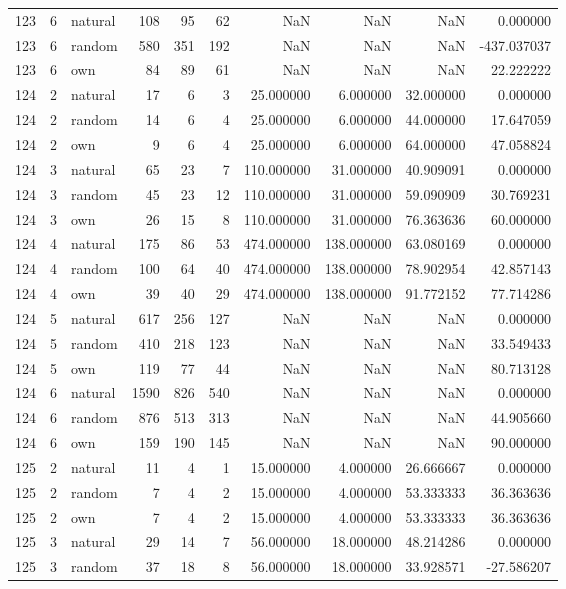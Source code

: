 \begin{table}[htbp]
\begin{tabular}{rrlrrrrrrr}
123 & 6 & natural & 108 & 95 & 62 & NaN & NaN & NaN & 0.000000 \\
123 & 6 & random & 580 & 351 & 192 & NaN & NaN & NaN & -437.037037 \\
123 & 6 & own & 84 & 89 & 61 & NaN & NaN & NaN & 22.222222 \\
124 & 2 & natural & 17 & 6 & 3 & 25.000000 & 6.000000 & 32.000000 & 0.000000 \\
124 & 2 & random & 14 & 6 & 4 & 25.000000 & 6.000000 & 44.000000 & 17.647059 \\
124 & 2 & own & 9 & 6 & 4 & 25.000000 & 6.000000 & 64.000000 & 47.058824 \\
124 & 3 & natural & 65 & 23 & 7 & 110.000000 & 31.000000 & 40.909091 & 0.000000 \\
124 & 3 & random & 45 & 23 & 12 & 110.000000 & 31.000000 & 59.090909 & 30.769231 \\
124 & 3 & own & 26 & 15 & 8 & 110.000000 & 31.000000 & 76.363636 & 60.000000 \\
124 & 4 & natural & 175 & 86 & 53 & 474.000000 & 138.000000 & 63.080169 & 0.000000 \\
124 & 4 & random & 100 & 64 & 40 & 474.000000 & 138.000000 & 78.902954 & 42.857143 \\
124 & 4 & own & 39 & 40 & 29 & 474.000000 & 138.000000 & 91.772152 & 77.714286 \\
124 & 5 & natural & 617 & 256 & 127 & NaN & NaN & NaN & 0.000000 \\
124 & 5 & random & 410 & 218 & 123 & NaN & NaN & NaN & 33.549433 \\
124 & 5 & own & 119 & 77 & 44 & NaN & NaN & NaN & 80.713128 \\
124 & 6 & natural & 1590 & 826 & 540 & NaN & NaN & NaN & 0.000000 \\
124 & 6 & random & 876 & 513 & 313 & NaN & NaN & NaN & 44.905660 \\
124 & 6 & own & 159 & 190 & 145 & NaN & NaN & NaN & 90.000000 \\
125 & 2 & natural & 11 & 4 & 1 & 15.000000 & 4.000000 & 26.666667 & 0.000000 \\
125 & 2 & random & 7 & 4 & 2 & 15.000000 & 4.000000 & 53.333333 & 36.363636 \\
125 & 2 & own & 7 & 4 & 2 & 15.000000 & 4.000000 & 53.333333 & 36.363636 \\
125 & 3 & natural & 29 & 14 & 7 & 56.000000 & 18.000000 & 48.214286 & 0.000000 \\
125 & 3 & random & 37 & 18 & 8 & 56.000000 & 18.000000 & 33.928571 & -27.586207 \\

\end{tabular}
\end{table}
